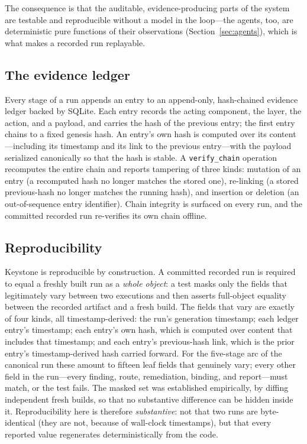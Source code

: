\documentclass[10pt,twocolumn]{article}
\begin{document}
The consequence is that the auditable, evidence-producing parts of the system
are testable and reproducible without a model in the loop---the agents, too, are
deterministic pure functions of their observations (Section~\ref{sec:agents}),
which is what makes a recorded run replayable.

\subsection{The evidence ledger}

Every stage of a run appends an entry to an append-only, hash-chained evidence
ledger backed by SQLite. Each entry records the acting component, the layer, the
action, and a payload, and carries the hash of the previous entry; the first
entry chains to a fixed genesis hash. An entry's own hash is computed over its
content---including its timestamp and its link to the previous entry---with the
payload serialized canonically so that the hash is stable. A
\texttt{verify\_chain} operation recomputes the entire chain and reports
tampering of three kinds: mutation of an entry (a recomputed hash no longer
matches the stored one), re-linking (a stored previous-hash no longer matches
the running hash), and insertion or deletion (an out-of-sequence entry
identifier). Chain integrity is surfaced on every run, and the committed
recorded run re-verifies its own chain offline.

\subsection{Reproducibility}

Keystone is reproducible by construction. A committed recorded run is required to
equal a freshly built run as a \emph{whole object}: a test masks only the fields
that legitimately vary between two executions and then asserts full-object
equality between the recorded artifact and a fresh build. The fields that vary
are exactly of four kinds, all timestamp-derived: the run's generation
timestamp; each ledger entry's timestamp; each entry's own hash, which is
computed over content that includes that timestamp; and each entry's
previous-hash link, which is the prior entry's timestamp-derived hash carried
forward. For the five-stage arc of the canonical run these amount to fifteen
leaf fields that genuinely vary; every other field in the run---every finding,
route, remediation, binding, and report---must match, or the test fails. The
masked set was established empirically, by diffing independent fresh builds, so
that no substantive difference can be hidden inside it. Reproducibility here is
therefore \emph{substantive}: not that two runs are byte-identical (they are not,
because of wall-clock timestamps), but that every reported value regenerates
deterministically from the code.
\end{document}

